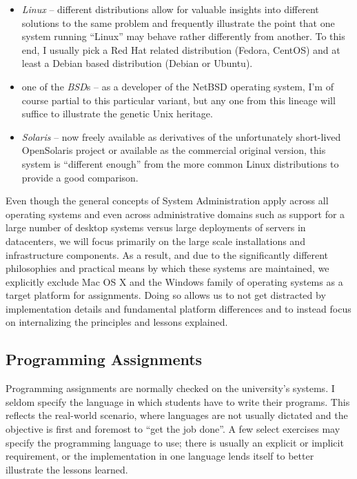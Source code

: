 \begin{itemize}
	\item {\em Linux} -- different distributions allow for valuable
		insights into different solutions to the same problem and
		frequently illustrate the point that one system running
		``Linux'' may behave rather differently from another.
		To this end, I usually pick a Red Hat related distribution
		(Fedora, CentOS) and at least a Debian based distribution
		(Debian or Ubuntu).
	\item one of the {\em BSD}s -- as a developer of the NetBSD
		operating system, I'm of course partial to this particular
		variant, but any one from this lineage will suffice to
		illustrate the genetic Unix heritage.
	\item {\em Solaris} -- now freely available as derivatives
		of the unfortunately short-lived OpenSolaris project or
		available as the commercial original version,
		this system is ``different enough'' from the more common Linux
		distributions to provide a good comparison.
\end{itemize}

Even though the general concepts of System
Administration apply across all operating systems and
even across administrative domains such as support for
a large number of desktop systems versus large
deployments of servers in datacenters, we will focus
primarily on the large scale installations and
infrastructure components.  As a result, and due to
the significantly different philosophies and practical
means by which these systems are maintained, we
explicitly exclude Mac OS X and the Windows family of
operating systems as a target platform for
assignments.  Doing so allows us to not get distracted
by implementation details and fundamental platform
differences and to instead focus on internalizing the
principles and lessons explained.


\subsection*{Programming Assignments}

Programming assignments are normally checked on the
university's systems.  I seldom specify the language
in which students have to write their programs.  This
reflects the real-world scenario, where languages are
not usually dictated and the objective is first and
foremost to ``get the job done''.  A few select
exercises may specify the programming language to use;
there is usually an explicit or implicit requirement,
or the implementation in one language lends itself to
better illustrate the lessons learned.

